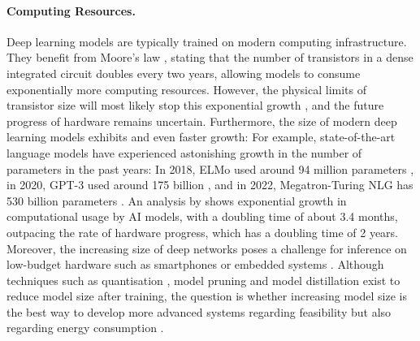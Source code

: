 \paragraph{Computing Resources.} Deep learning models are typically trained on modern computing infrastructure. They benefit from Moore's law , stating that the number of transistors in a dense integrated circuit doubles every two years, allowing models to consume exponentially more computing resources. However, the physical limits of transistor size will most likely stop this exponential growth , and the future progress of hardware remains uncertain.
Furthermore, the size of modern deep learning models exhibits and even faster growth:
For example, state-of-the-art language models have experienced astonishing growth in the number of parameters in the past years: In 2018, ELMo used around 94 million parameters , in 2020, GPT-3 used around 175 billion , and in 2022, Megatron-Turing NLG has 530 billion parameters .
An analysis by  shows exponential growth in computational usage by AI models, with a doubling time of about 3.4 months, outpacing the rate of hardware progress, which has a doubling time of 2 years. Moreover, the increasing size of deep networks poses a challenge for inference on low-budget hardware such as smartphones or embedded systems . Although techniques such as quantisation , model pruning  and model distillation  exist to reduce model size after training, the question is whether increasing model size is the best way to develop more advanced systems regarding feasibility but also regarding energy consumption \cite{garcia-martin_estimation_2019}.

